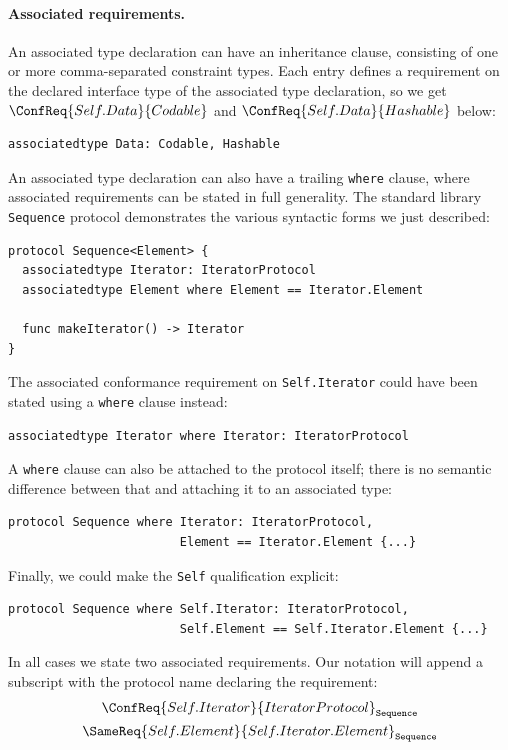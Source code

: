 \documentclass[../generics]{subfiles}
\begin{document}
\paragraph{Associated requirements.}
An associated type declaration can have an inheritance clause, consisting of one or more comma-separated constraint types. Each entry defines a requirement on the declared interface type of the associated type declaration, so we get $\ConfReq{Self.Data}{Codable}$ and $\ConfReq{Self.Data}{Hashable}$ below:
\begin{Verbatim}
associatedtype Data: Codable, Hashable
\end{Verbatim}

An associated type declaration can also have a trailing \texttt{where} clause, where associated requirements can be stated in full generality. The standard library \texttt{Sequence} protocol demonstrates the various syntactic forms we just described:
\begin{Verbatim}
protocol Sequence<Element> {
  associatedtype Iterator: IteratorProtocol
  associatedtype Element where Element == Iterator.Element

  func makeIterator() -> Iterator
}
\end{Verbatim}
The associated conformance requirement on \texttt{Self.Iterator} could have been stated using a \texttt{where} clause instead:
\begin{Verbatim}
associatedtype Iterator where Iterator: IteratorProtocol
\end{Verbatim}
A \texttt{where} clause can also be attached to the protocol itself; there is no semantic difference between that and attaching it to an associated type:
\begin{Verbatim}
protocol Sequence where Iterator: IteratorProtocol,
                        Element == Iterator.Element {...}
\end{Verbatim}
Finally, we could make the \texttt{Self} qualification explicit:
\begin{Verbatim}
protocol Sequence where Self.Iterator: IteratorProtocol,
                        Self.Element == Self.Iterator.Element {...}
\end{Verbatim}

In all cases we state two associated requirements. Our notation will append a subscript with the protocol name declaring the requirement:
\begin{gather*}
\ConfReq{Self.Iterator}{IteratorProtocol}_\texttt{Sequence}\\
\SameReq{Self.Element}{Self.Iterator.Element}_\texttt{Sequence}
\end{gather*}
\end{document}
